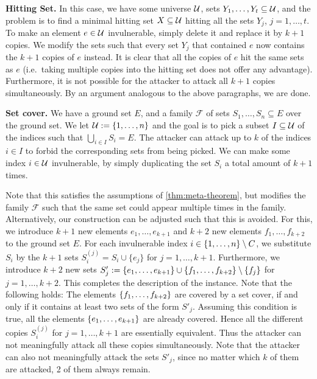 \textbf{Hitting Set.} In this case, we have some universe $\mathcal{U}$, sets $Y_1,\dots,Y_t \subseteq \mathcal{U}$, and the problem is to find a minimal hitting set $X \subseteq \mathcal{U}$ hitting all the sets $Y_j$, $j =1,\dots,t$. 
To make an element $e \in \mathcal{U}$ invulnerable, simply delete it and replace it by $k + 1$ copies.
We modify the sets such that every set $Y_j$ that contained $e$ now contains the $k+1$ copies of $e$ instead. 
It is clear that all the copies of $e$ hit the same sets as $e$ (i.e.\ taking multiple copies into the hitting set does not offer any advantage).
Furthermore, it is not possible for the attacker to attack all $k+1$ copies simultaneously.
By an argument analogous to the above paragraphs, we are done.

\textbf{Set cover.} We have a ground set $E$, and a family $\mathcal{F}$ of sets $S_1, \dots, S_n \subseteq E$ over the ground set. 
We let $\mathcal{U} := \{ 1, \ldots, n \}$ and the goal is to pick a subset $I \subseteq \mathcal{U}$ of the indices such that $\bigcup_{i \in I} S_i = E$.
The attacker can attack up to $k$ of the indices $i \in I$ to forbid the corresponding sets from being picked.
We can make some index $i \in \mathcal{U}$ invulnerable, by simply duplicating the set $S_i$ a total amount of $k+1$ times.

Note that this satisfies the assumptions of \cref{thm:meta-theorem}, but modifies the family $\mathcal{F}$ such that the same set could appear multiple times in the family.
Alternatively, our construction can be adjusted such that this is avoided.
For this, we introduce $k+1$ new elements $e_1, \dots, e_{k+1}$ and $k+2$ new elements $f_1,\dots, f_{k+2}$ to the ground set $E$.
For each invulnerable index $i \in \{ 1, \ldots, n \} \setminus C$, we substitute $S_i$ by the $k+1$ sets $S_i^{(j)} = S_i \cup \{e_j\}$ for $j=1,\dots,k+1$.
Furthermore, we introduce $k+2$ new sets $S'_j := \{ e_1, \ldots, e_{k+1} \} \cup \{ f_1, \ldots, f_{k+2} \} \setminus \{ f_j \}$ for $j =1, \dots, k+2$. This completes the description of the instance.
Note that the following holds: The elements $\{ f_1, \ldots, f_{k+2} \}$ are covered by a set cover, if and only if it contains at least two sets of the form $S'_j$. 
Assuming this condition is true, all the elements $\{ e_1, \ldots, e_{k+1} \}$ are already covered.
Hence all the different copies $S_i^{(j)}$ for $j=1,\dots,k+1$ are essentially equivalent.
Thus the attacker can not meaningfully attack all these copies simultaneously.
Note that the attacker can also not meaningfully attack the sets $S'_j$, since no matter which $k$ of them are attacked, 2 of them always remain.


